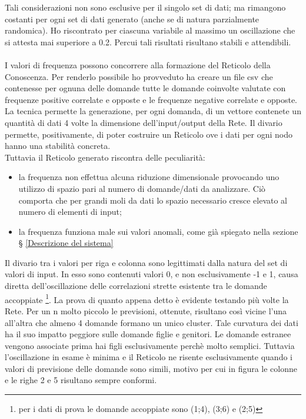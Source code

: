 \noindent
Tali considerazioni non sono esclusive per il singolo set di dati; ma rimangono costanti per ogni set di dati generato (anche se di natura parzialmente randomica). Ho riscontrato per ciascuna variabile al massimo un oscillazione che si attesta mai superiore a 0.2. Percui tali risultati risultano stabili e attendibili.
\\\\
I valori di frequenza possono concorrere alla formazione del Reticolo della Conoscenza. Per renderlo possibile ho provveduto ha creare un file csv che contenesse per ognuna delle domande tutte le domande coinvolte valutate con frequenze positive correlate e opposte e le frequenze negative correlate e opposte. La tecnica permette la generazione, per ogni domanda, di un vettore contenete un quantit\`a di dati 4 volte la dimensione dell'input/output della Rete.
Il divario permette, positivamente, di poter costruire un Reticolo ove i dati per ogni nodo hanno una stabilit\`a concreta.\\
Tuttavia il Reticolo generato riscontra delle peculiarit\`a:
\begin{itemize}
\item la frequenza non effettua alcuna riduzione dimensionale provocando uno utilizzo di spazio pari al numero di domande/dati da analizzare. Ci\`o comporta che per grandi moli da dati lo spazio necessario cresce elevato al numero di elementi di input;
\item la frequenza funziona male sui valori anomali, come gi\`a spiegato nella sezione § \ref{Descrizione del sistema}
\end{itemize}
\noindent
Il divario tra i valori per riga e colonna sono legittimati dalla natura del set di valori di input. In esso sono contenuti valori 0, e non esclusivamente -1 e 1, causa diretta dell'oscillazione delle correlazioni strette esistente tra le domande accoppiate \footnote{per i dati di prova le domande accoppiate sono (1;4), (3;6) e (2;5)}. La prova di quanto appena detto \`e evidente testando pi\`u volte la Rete. Per un n molto piccolo le previsioni, ottenute, risultano cos\`i vicine l'una all'altra che almeno 4 domande formano un unico cluster.
Tale curvatura dei dati ha il suo impatto peggiore sulle domande figlie e genitori. Le domande estranee vengono associate prima hai figli esclusivamente perch\`e molto semplici. Tuttavia l'oscillazione in esame \`e minima e il Reticolo ne risente esclusivamente quando i valori di previsione delle domande sono simili, motivo per cui in figura le colonne e le righe 2 e 5 risultano sempre conformi. 
